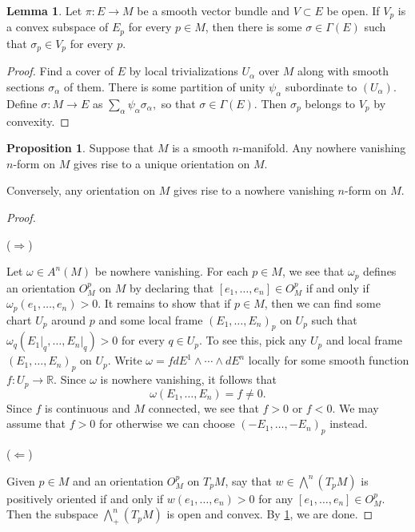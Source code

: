 \documentclass[10pt,letterpaper,cm]{nupset}
\theoremstyle{definition}
\theoremstyle{theorem}
\newtheorem{lemma}[definition]{Lemma}
\newtheorem{prop}[definition]{Proposition}
\theoremstyle{remark}
\newcommand{\R}{\mathbb R}
\newcommand{\1}{\mathbf{1}}
\newcommand{\0}{\vec 0}
\begin{document}
\begin{lemma}\label{convex}
Let $\pi : E \to M$ be a smooth vector bundle and $V \subset E$ be open. If $V_p$ is a convex subspace of $E_p$ for every $p\in M$, then there is some $\sigma \in \Gamma(E)$ such that $\sigma_p \in V_p$ for every $p$.
\end{lemma}
\begin{proof}
Find a cover of $E$ by local trivializations $U_{\alpha}$ over $M$ along with smooth sections $\sigma_{\alpha}$ of them. There is some partition of unity $\psi_{\alpha}$ subordinate to $(U_{\alpha})$. Define $\sigma: M \to E$ as $\sum_{\alpha} \psi_{\alpha}\sigma_{\alpha} ,$ so that $\sigma \in \Gamma(E)$. Then $\sigma_p$ belongs to $V_p$ by convexity.
\end{proof}

\begin{prop}\label{nwv}
Suppose that $M$ is a smooth $n$-manifold. Any nowhere vanishing $n$-form on $M$ gives rise to a unique orientation on $M$. 

Conversely, any orientation on $M$ gives rise to a nowhere vanishing $n$-form on $M$.
\end{prop}
\begin{proof} $ $
\smallskip

($\Longrightarrow$)

Let $\omega \in A^n(M)$ be nowhere vanishing. For each $p \in M$, we see that $\omega_p$ defines an orientation $O_M^p$ on $M$ by declaring that $[e_1, \ldots, e_n] \in  O_M^p$ if and only if $\omega_p(e_1, \ldots, e_n) >0$. It remains to show that if $p\in M$, then we can find some chart $U_p$ around $p$ and some local frame $\left(E_1, \ldots, E_n\right)_p$ on $U_p$ such that $\omega_q(E_1\bigr\rvert_q, \ldots, E_n\bigr\rvert_q) >0$ for every $q \in U_p$. To see this, pick any $U_p$ and local frame $\left(E_1, \ldots, E_n\right)_p$ on $U_p$. Write $\omega = fdE^1 \wedge \cdots \wedge dE^n$ locally for some smooth function $f: U_p \to \R$. Since $\omega$ is nowhere vanishing, it follows that $$\omega(E_1, \ldots, E_n) = f \ne 0.$$ Since $f$ is continuous and $M$ connected, we see that $f>0$ or $f<0$. We may assume that $f>0$ for otherwise we can choose $\left({-E_1}, \ldots, {-E_n}\right)_p$ instead. 

\medskip

($\Longleftarrow$)

Given $p\in M$ and an orientation $O_M^p$ on $T_pM$, say that $w \in \bigwedge^n(T_pM)$ is positively oriented if and only if $w(e_1, \ldots, e_n) >0$ for any $[e_1, \ldots, e_n] \in O_M^p$. Then the subspace $\bigwedge^n_+(T_pM)$ is open and convex. By \cref{convex}, we are done.
\end{proof}
\end{document}
